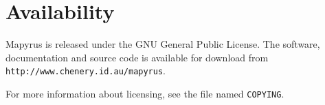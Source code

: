 
\section{Availability}

Mapyrus is released under the GNU General Public License.
The software, documentation and source code is available for download
from \texttt{http://www.chenery.id.au/mapyrus}.

For more information about licensing, see the file named \texttt{COPYING}.

